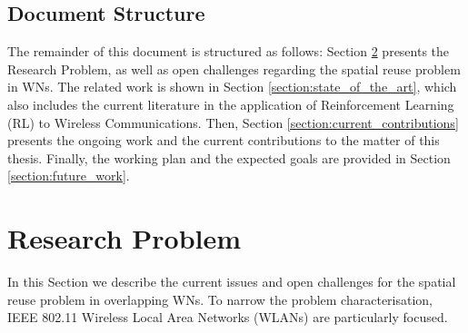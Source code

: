 \documentclass[12pt, a4paper,twoside]{tesi_upf}
\begin{document}
		\section{Document Structure}
		\label{section:document_structure}
			The remainder of this document is structured as follows: Section \ref{section:research_problem} presents the Research Problem, as well as open challenges regarding the spatial reuse problem in WNs. The related work is shown in Section \ref{section:state_of_the_art}, which also includes the current literature in the application of Reinforcement Learning (RL) to Wireless Communications. Then, Section \ref{section:current_contributions} presents the ongoing work and the current contributions to the matter of this thesis. Finally, the working plan and the expected goals are provided in Section \ref{section:future_work}.

	\chapter{Research Problem}
	\label{section:research_problem}
		In this Section we describe the current issues and open challenges for the spatial reuse problem in overlapping WNs. To narrow the problem characterisation, IEEE 802.11 Wireless Local Area Networks (WLANs) are particularly focused.
		
\end{document}
